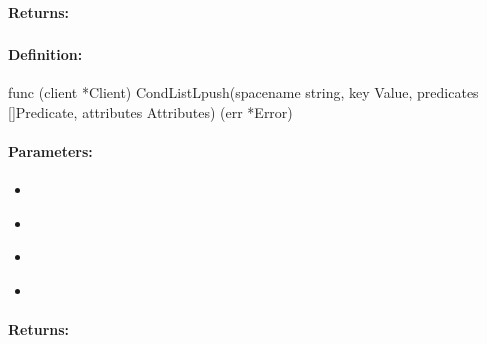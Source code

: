 \paragraph{Returns:}


\pagebreak
\subsubsection{}
\label{api:Go:CondListLpush}


\paragraph{Definition:}
\begin{gocode}
func (client *Client) CondListLpush(spacename string, key Value, predicates []Predicate, attributes Attributes) (err *Error)
\end{gocode}

\paragraph{Parameters:}
\begin{itemize}[noitemsep]
\item {}\\

\item {}\\

\item {}\\

\item {}\\

\end{itemize}

\paragraph{Returns:}


\pagebreak
\subsubsection{}
\label{api:Go:GroupListLpush}



